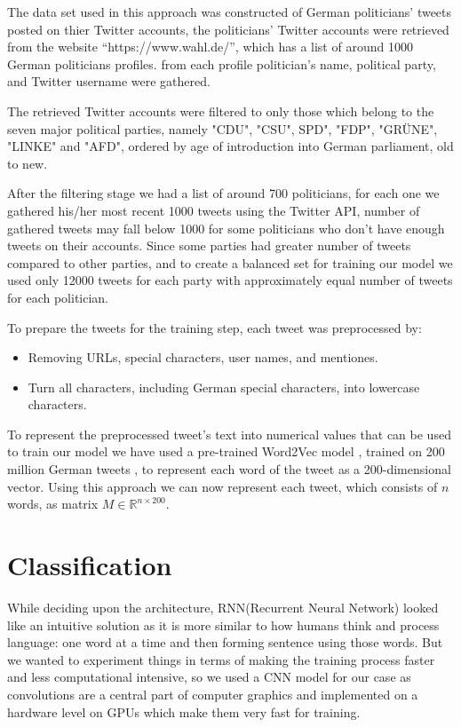 \documentclass[10pt, oneside]{article}
\begin{document}
\begin{multicols}{2}
The data set used in this approach was constructed of German politicians' tweets posted on thier Twitter accounts, the politicians' Twitter accounts were retrieved from the website “https://www.wahl.de/”, which has a list of around 1000 German politicians profiles. from each profile politician’s name, political party, and Twitter username were gathered.
 
The retrieved Twitter accounts were filtered to only those which belong to the seven major political parties, namely "CDU", "CSU", SPD", "FDP", "GRÜNE", "LINKE" and "AFD", ordered by age of introduction into German parliament, old to new. 

After the filtering stage we had  a list of around 700 politicians, for each one we gathered his/her most recent 1000 tweets using the Twitter API, number of gathered tweets may fall below 1000 for some politicians who don’t have enough tweets on their accounts. Since some parties had greater number of tweets compared to other parties, and  to create a balanced set for training our model we used only 12000 tweets for each party with approximately equal number of tweets for each politician.    

To prepare the tweets for the training step, each tweet was preprocessed by:
\begin{itemize}
\item Removing URLs, special characters, user names, and mentiones.
\item Turn all characters, including German special characters, into lowercase characters.
\end{itemize}

To represent the preprocessed tweet’s text into numerical values that can be used to train our model we have used  a pre-trained Word2Vec model \cite{DBLP:journals/corr/abs-1301-3781}, trained on 200 million German tweets \cite{cieliebak2017twitter},  to represent each word of the tweet as a  200-dimensional vector.  Using this approach we can now represent each tweet, which consists of $n$ words, as matrix $M \in \mathbb{R}^{n \times 200}$.


\section{Classification}

While deciding upon the architecture, RNN(Recurrent Neural Network) looked like an intuitive solution as it is more similar to how humans think and process language: one word at a time and then forming sentence using those words. But we wanted to experiment things in terms of making the training process faster and less computational intensive, so we used a CNN model for our case as convolutions are a central part of computer graphics and implemented on a hardware level on GPUs which make them very fast for training.


\end{multicols}
\end{document}
